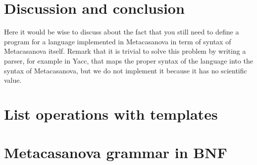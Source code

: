 \documentclass[8pt,a5paper]{extbook}
\theoremstyle{definition}
\begin{document}
\chapter{Discussion and conclusion}
\label{ch:discussion}
Here it would be wise to discuss about the fact that you still need to define a program for a language implemented in Metacasanova in term of syntax of Metacasanova itself. Remark that it is trivial to solve this problem by writing a parser, for example in Yacc, that maps the proper syntax of the language into the syntax of Metacasanova, but we do not implement it because it has no scientific value.

\appendix
\chapter{List operations with templates}
\label{app:template}


\chapter{Metacasanova grammar in BNF}
\label{app:metacasanova_grammar}

\backmatter



\end{document}
